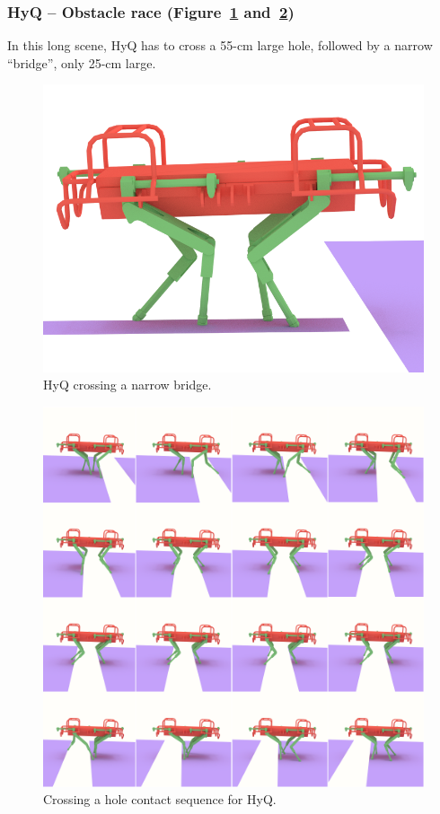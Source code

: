 \subsubsection{HyQ -- Obstacle race (Figure~\ref{fig:HyQ_bridge} and~\ref{fig:HyQ_obs})}
In this long scene, HyQ has to cross a 55-cm large hole, followed by a narrow ``bridge'', only 25-cm large.

\begin{figure}
  \centering
  \includegraphics[width=0.4\linewidth]{figures/HyQ_bridge}
  \caption{
           HyQ crossing a narrow bridge. }
		   \label{fig:HyQ_bridge}
\end{figure}

\begin{figure}
  \centering
  \includegraphics[width=1\linewidth]{figures/HyQ_obs}
  \caption{
           Crossing a hole contact sequence for HyQ. }
		   \label{fig:HyQ_obs}
\end{figure}



